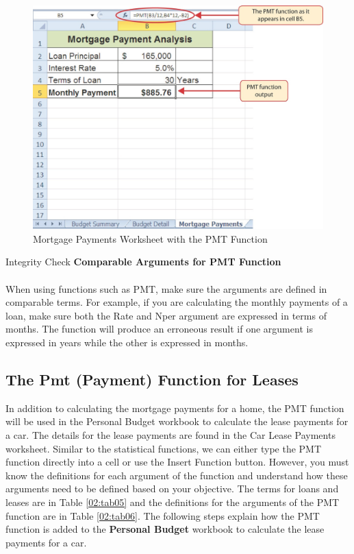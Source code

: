 \begin{figure}[H]
	\centering
	\includegraphics[width=\maxwidth{.95\linewidth}]{gfx/ch02_fig33}
	\caption{Mortgage Payments Worksheet with the PMT Function}
	\label{02:fig33}
\end{figure}

\begin{center}
	\begin{infobox}{Integrity Check}
		\textbf{Comparable Arguments for PMT Function}
		\\
		\\
		When using functions such as PMT, make sure the arguments are defined in comparable terms. For example, if you are calculating the monthly payments of a loan, make sure both the Rate and Nper argument are expressed in terms of months. The function will produce an erroneous result if one argument is expressed in years while the other is expressed in months.		
	\end{infobox}
\end{center}

\subsection{The Pmt (Payment) Function for Leases}

In addition to calculating the mortgage payments for a home, the PMT function will be used in the Personal Budget workbook to calculate the lease payments for a car. The details for the lease payments are found in the Car Lease Payments worksheet. Similar to the statistical functions, we can either type the PMT function directly into a cell or use the Insert Function button. However, you must know the definitions for each argument of the function and understand how these arguments need to be defined based on your objective. The terms for loans and leases are in Table \ref{02:tab05} and the definitions for the arguments of the PMT function are in Table \ref{02:tab06}. The following steps explain how the PMT function is added to the \textbf{Personal Budget} workbook to calculate the lease payments for a car.

